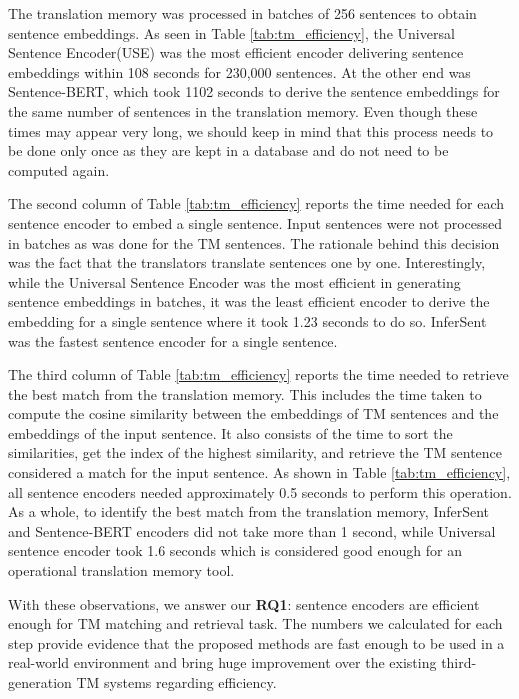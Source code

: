 The translation memory was processed in batches of 256 sentences to obtain sentence embeddings. As seen in Table \ref{tab:tm_efficiency}, the Universal Sentence Encoder(USE) was the most efficient encoder delivering sentence embeddings within 108 seconds for 230,000 sentences. At the other end was Sentence-BERT, which took 1102 seconds to derive the sentence embeddings for the same number of sentences in the translation memory. Even though these times may appear very long, we should keep in mind that this process needs to be done only once as they are kept in a database and do not need to be computed again. 

The second column of Table \ref{tab:tm_efficiency} reports the time needed for each sentence encoder to embed a single sentence. Input sentences were not processed in batches as was done for the TM sentences. The rationale behind this decision was the fact that the translators translate sentences one by one. Interestingly, while the Universal Sentence Encoder was the most efficient in generating sentence embeddings in batches, it was the least efficient encoder to derive the embedding for a single sentence where it took 1.23 seconds to do so. InferSent was the fastest sentence encoder for a single sentence. 

The third column of Table \ref{tab:tm_efficiency} reports the time needed to retrieve the best match from the translation memory. This includes the time taken to compute the cosine similarity between the embeddings of TM sentences and the embeddings of the input sentence. It also consists of the time to sort the similarities, get the index of the highest similarity, and retrieve the TM sentence considered a match for the input sentence. As shown in Table \ref{tab:tm_efficiency}, all sentence encoders needed approximately 0.5 seconds to perform this operation. As a whole, to identify the best match from the translation memory, InferSent and Sentence-BERT encoders did not take more than 1 second, while Universal sentence encoder took 1.6 seconds which is considered good enough for an operational translation memory tool. 

With these observations, we answer our \textbf{RQ1}: sentence encoders are efficient enough for TM matching and retrieval task. The numbers we calculated for each step provide evidence that the proposed methods are fast enough to be used in a real-world environment and bring huge improvement over the existing third-generation TM systems regarding efficiency.


